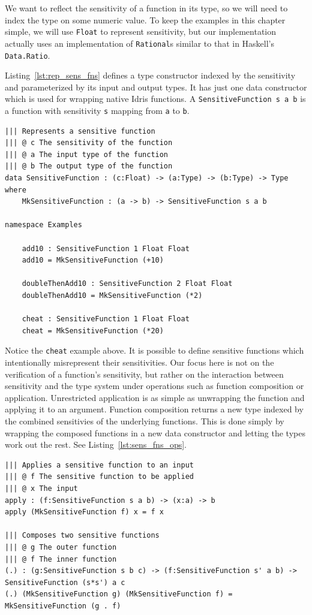 \documentclass[12pt]{report}
\begin{document}
We want to reflect the sensitivity of a function in its type, so we will need to index the type on some numeric value.
To keep the examples in this chapter simple, we will use \texttt{Float} to represent sensitivity, but our implementation actually uses an implementation of \texttt{Rational}s similar to that in Haskell's \texttt{Data.Ratio}.

Listing~\ref{lst:rep_sens_fns} defines a type constructor indexed by the sensitivity and parameterized by its input and output types.
It has just one data constructor which is used for wrapping native Idris functions.
A \texttt{SensitiveFunction s a b} is a function with sensitivity \texttt{s} mapping from \texttt{a} to \texttt{b}.

\begin{lstlisting}[caption={Representing sensitive functions},label={lst:rep_sens_fns}]
||| Represents a sensitive function
||| @ c The sensitivity of the function
||| @ a The input type of the function
||| @ b The output type of the function
data SensitiveFunction : (c:Float) -> (a:Type) -> (b:Type) -> Type where
    MkSensitiveFunction : (a -> b) -> SensitiveFunction s a b

namespace Examples

    add10 : SensitiveFunction 1 Float Float
    add10 = MkSensitiveFunction (+10)

    doubleThenAdd10 : SensitiveFunction 2 Float Float
    doubleThenAdd10 = MkSensitiveFunction (*2)

    cheat : SensitiveFunction 1 Float Float
    cheat = MkSensitiveFunction (*20)
\end{lstlisting}

Notice the \texttt{cheat} example above.
It is possible to define sensitive functions which intentionally misrepresent their sensitivities.
Our focus here is not on the verification of a function's sensitivity, but rather on the interaction between sensitivity and the type system under operations such as function composition or application.
Unrestricted application is as simple as unwrapping the function and applying it to an argument.
Function composition returns a new type indexed by the combined sensitivies of the underlying functions.
This is done simply by wrapping the composed functions in a new data constructor and letting the types work out the rest.
See Listing~\ref{lst:sens_fns_ops}.

\begin{lstlisting}[caption={Sensitive function operations},label={lst:sens_fns_ops}]
||| Applies a sensitive function to an input
||| @ f The sensitive function to be applied
||| @ x The input
apply : (f:SensitiveFunction s a b) -> (x:a) -> b
apply (MkSensitiveFunction f) x = f x

||| Composes two sensitive functions
||| @ g The outer function
||| @ f The inner function
(.) : (g:SensitiveFunction s b c) -> (f:SensitiveFunction s' a b) -> SensitiveFunction (s*s') a c
(.) (MkSensitiveFunction g) (MkSensitiveFunction f) = MkSensitiveFunction (g . f)
\end{lstlisting}
\end{document}
